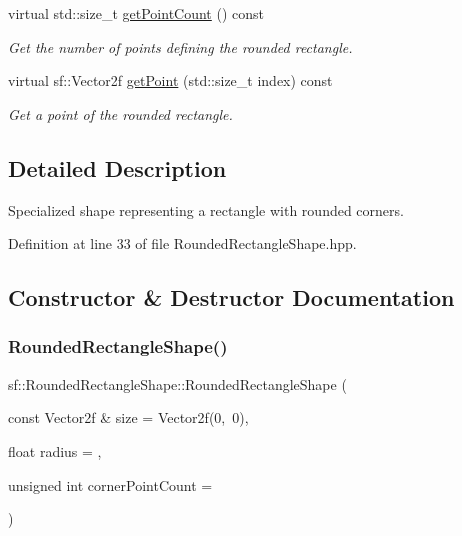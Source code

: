 \begin{DoxyCompactItemize}
virtual std\+::size\+\_\+t \mbox{\hyperlink{classsf_1_1_rounded_rectangle_shape_a96501a3349af7c0431dfa16bcb3dc546}{get\+Point\+Count}} () const
\begin{DoxyCompactList}\small\item\em Get the number of points defining the rounded rectangle. \end{DoxyCompactList}\item 
virtual sf\+::\+Vector2f \mbox{\hyperlink{classsf_1_1_rounded_rectangle_shape_a886ad233fd59331e3b792afeb787d764}{get\+Point}} (std\+::size\+\_\+t index) const
\begin{DoxyCompactList}\small\item\em Get a point of the rounded rectangle. \end{DoxyCompactList}\end{DoxyCompactItemize}


\subsection{Detailed Description}
Specialized shape representing a rectangle with rounded corners. 

Definition at line 33 of file Rounded\+Rectangle\+Shape.\+hpp.



\subsection{Constructor \& Destructor Documentation}
\mbox{\label{classsf_1_1_rounded_rectangle_shape_aa49850069d9921338a5727073ecf2475}} 
\subsubsection{\texorpdfstring{RoundedRectangleShape()}{RoundedRectangleShape()}}
{\footnotesize\ttfamily sf\+::\+Rounded\+Rectangle\+Shape\+::\+Rounded\+Rectangle\+Shape (\begin{DoxyParamCaption}\item[{const Vector2f \&}]{size = {\ttfamily Vector2f(0,~0)},  }\item[{float}]{radius = {},  }\item[{unsigned int}]{corner\+Point\+Count = {} }\end{DoxyParamCaption})\hspace{0.3cm}{\ttfamily [explicit]}}



